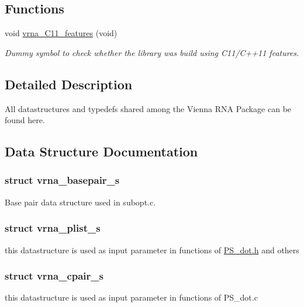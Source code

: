 \subsection*{Functions}
\begin{DoxyCompactItemize}
\item 
void \hyperlink{group__data__structures_ga21744ae2d6a17309f9327d3547cef0cb}{vrna\+\_\+\+C11\+\_\+features} (void)
\begin{DoxyCompactList}\small\item\em Dummy symbol to check whether the library was build using C11/\+C++11 features. \end{DoxyCompactList}\end{DoxyCompactItemize}


\subsection{Detailed Description}
All datastructures and typedefs shared among the Vienna R\+NA Package can be found here. 



\subsection{Data Structure Documentation}
\label{structvrna__basepair__s}
\hypertarget{group__data__structures_structvrna__basepair__s}{}
\subsubsection{struct vrna\+\_\+basepair\+\_\+s}
Base pair data structure used in subopt.\+c. \label{structvrna__plist__s}
\hypertarget{group__data__structures_structvrna__plist__s}{}
\subsubsection{struct vrna\+\_\+plist\+\_\+s}
this datastructure is used as input parameter in functions of \hyperlink{PS__dot_8h}{P\+S\+\_\+dot.\+h} and others \label{structvrna__cpair__s}
\hypertarget{group__data__structures_structvrna__cpair__s}{}
\subsubsection{struct vrna\+\_\+cpair\+\_\+s}
this datastructure is used as input parameter in functions of P\+S\+\_\+dot.\+c \label{structvrna__color__s}
\hypertarget{group__data__structures_structvrna__color__s}{}
